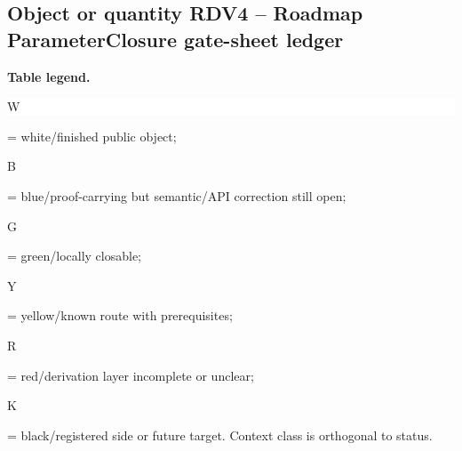 \subsection*{Object or quantity RDV4 -- Roadmap ParameterClosure gate-sheet ledger}
\hypertarget{objproof:RDV4}{}
\par\smallskip\noindent\begin{minipage}{0.99\linewidth}\footnotesize\raggedright\textbf{Table legend.} \colorbox{white}{\strut W} = white/finished public object; \colorbox{cyan!20}{\strut B} = blue/proof-carrying but semantic/API correction still open; \colorbox{green!18}{\strut G} = green/locally closable; \colorbox{yellow!25}{\strut Y} = yellow/known route with prerequisites; \colorbox{red!20}{\strut R} = red/derivation layer incomplete or unclear; \colorbox{black!18}{\strut K} = black/registered side or future target. Context class is orthogonal to status.\end{minipage}\par\vspace{0.25em}
